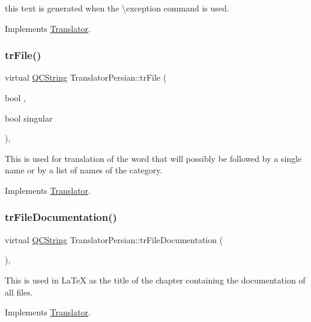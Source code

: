 this text is generated when the \textbackslash{}exception command is used. 

Implements \mbox{\hyperlink{class_translator}{Translator}}.

\mbox{\label{class_translator_persian_ae1ba6330d764c7b59e269630592b9528}} 
\subsubsection{\texorpdfstring{trFile()}{trFile()}}
{\footnotesize\ttfamily virtual \mbox{\hyperlink{class_q_c_string}{Q\+C\+String}} Translator\+Persian\+::tr\+File (\begin{DoxyParamCaption}\item[{bool}]{,  }\item[{bool}]{singular }\end{DoxyParamCaption})\hspace{0.3cm}{\ttfamily [inline]}, {\ttfamily [virtual]}}

This is used for translation of the word that will possibly be followed by a single name or by a list of names of the category. 

Implements \mbox{\hyperlink{class_translator}{Translator}}.

\mbox{\label{class_translator_persian_a1d32bedf28cc35d092947fa99a50445c}} 
\subsubsection{\texorpdfstring{trFileDocumentation()}{trFileDocumentation()}}
{\footnotesize\ttfamily virtual \mbox{\hyperlink{class_q_c_string}{Q\+C\+String}} Translator\+Persian\+::tr\+File\+Documentation (\begin{DoxyParamCaption}{ }\end{DoxyParamCaption})\hspace{0.3cm}{\ttfamily [inline]}, {\ttfamily [virtual]}}

This is used in La\+TeX as the title of the chapter containing the documentation of all files. 

Implements \mbox{\hyperlink{class_translator}{Translator}}.

